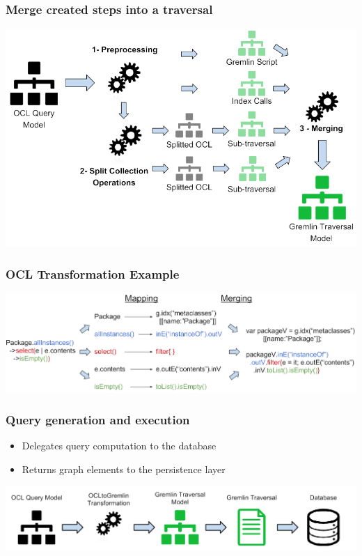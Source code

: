 \documentclass[10pt]{beamer}
\begin{document}
\begin{frame}[c]\frametitle{Merge created steps into a traversal}
    \begin{center}
      \includegraphics[width=\textwidth]{mogwai-transformation.png}
    \end{center}
\end{frame}

\begin{frame}[c]\frametitle{OCL Transformation Example}
    \begin{center}
      \includegraphics[width=\textwidth]{mogwai-ocl-transformation.png}
    \end{center}	
\end{frame}

\begin{frame}[c]\frametitle{Query generation and execution}
	
	\begin{itemize}
		\item Delegates query computation to the database
		\item Returns graph elements to the persistence layer
	\end{itemize}
	
 \begin{center}
   \includegraphics[width=\textwidth]{mogwai-architecture.png}
 \end{center}
	
\end{frame}
\end{document}
